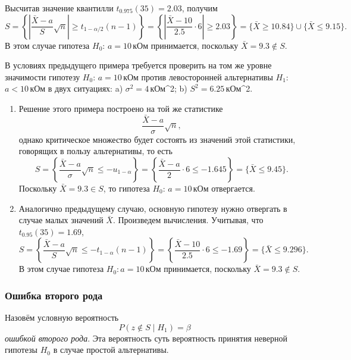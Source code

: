 \begin{ex}
\begin{solution}
\begin{enumerate}[label=\alph*)]
      Высчитав значение квантилли $ t_{0.975}(35) = 2.03 $, получим 
      \[
          S = \left\{ \left| \frac{\bar X - a}{S}\sqrt n \right| \geqslant
          t_{1-\alpha/2}(n-1) \right\} = \left\{ \left| \frac{\bar X - 10}{2.5}\cdot 6
          \right| \geqslant 2.03 \right\} = \{\bar X \geqslant 10.84\} \cup \{\bar X
          \leqslant 9.15\}.
      \]
      В этом случае гипотеза $ H_0 $: $ a = 10 $\,кОм принимается, поскольку $ \bar X
      = 9.3 \notin S$.
    \end{enumerate}

  \end{solution}

\end{ex}

\begin{ex}\label{ex:2}
	В условиях предыдущего примера требуется проверить на том же уровне значимости
	гипотезу $ H_0 $: $ a = 10 $\,кОм против левосторонней альтернативы $ H_1 $:
	$ a < 10 $\,кОм в двух ситуациях: a) $ \sigma^2 = 4 $\,кОм^2; b) $ S^2 = 6.25
	$\,кОм^2.

	\begin{solution}
		\begin{enumerate}[label=\alph*)]
			\item\label{enum:1} Решение этого примера  построено на той же статистике 
			\[
					\frac{\bar X - a}{\sigma}\sqrt n,
			\]
			однако критическое множество будет состоять из значений этой статистики,
			говорящих в пользу альтернативы, то есть 
			\[
				S = \left\{ \frac{\bar X - a}{\sigma}\sqrt n \leqslant - u_{1-\alpha}
				\right\} = \left\{ \frac{\bar X - a}{2} \cdot 6 \leqslant - 1.645
				\right\} = \{\bar X \leqslant 9.45 \}.
			\]
		Поскольку $ \bar X = 9.3 \in S $, то гипотеза $ H_0 $: $ a = 10 $\,кОм
		отвергается.	
	\item Аналогично предыдущему случаю, основную гипотезу нужно отвергать в случае малых 
		значений $\bar X$. Произведем вычисления. Учитывая, что $ t_{0.95}(35) = 1.69 $,
	\[
		S = \left\{ \frac{\bar X - a}{S}\sqrt n \leqslant -t_{1-\alpha}(n-1)
		\right\} = \left\{ \frac{\bar X - 10}{2.5}\cdot 6 \leqslant -1.69 \right\} =
		\{\bar X \leqslant 9.296\}.
	\]
	В этом случае гипотеза $ H_0: a = 10 $\,кОм принимается, поскольку $ \bar X =
	9.3 \notin S$.
		\end{enumerate}

	\end{solution}
\end{ex}

\subsubsection{Ошибка второго рода}
\begin{definition}
Назовём условную вероятность
\[
	P(z\notin S \mid H_1) = \beta
\]
\emph{ошибкой второго рода}. Эта вероятность суть вероятность принятия неверной
гипотезы $ H_0 $ в случае простой альтернативы.
\end{definition}

